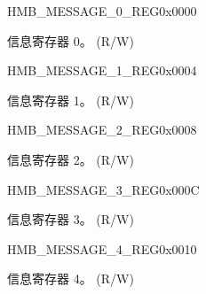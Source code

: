 \begin{register}{H}{MB\_MESSAGE\_0\_REG}{0x0000}\label{regdesc:MBMESSAGE0REG}
%
\regnewline%
\begin{regdesc}\begin{reglist}
\label{fielddesc:MBMESSAGE0}\item [MB\_MESSAGE\_0] 信息寄存器 0。 (R/W)
\end{reglist}\end{regdesc}
\end{register}


\begin{register}{H}{MB\_MESSAGE\_1\_REG}{0x0004}\label{regdesc:MBMESSAGE1REG}
%
\regnewline%
\begin{regdesc}\begin{reglist}
\label{fielddesc:MBMESSAGE1}\item [MB\_MESSAGE\_1] 信息寄存器 1。 (R/W)
\end{reglist}\end{regdesc}
\end{register}


\begin{register}{H}{MB\_MESSAGE\_2\_REG}{0x0008}\label{regdesc:MBMESSAGE2REG}
%
\regnewline%
\begin{regdesc}\begin{reglist}
\label{fielddesc:MBMESSAGE2}\item [MB\_MESSAGE\_2] 信息寄存器 2。 (R/W)
\end{reglist}\end{regdesc}
\end{register}


\begin{register}{H}{MB\_MESSAGE\_3\_REG}{0x000C}\label{regdesc:MBMESSAGE3REG}
%
\regnewline%
\begin{regdesc}\begin{reglist}
\label{fielddesc:MBMESSAGE3}\item [MB\_MESSAGE\_3] 信息寄存器 3。 (R/W)
\end{reglist}\end{regdesc}
\end{register}


\begin{register}{H}{MB\_MESSAGE\_4\_REG}{0x0010}\label{regdesc:MBMESSAGE4REG}
%
\regnewline%
\begin{regdesc}\begin{reglist}
\label{fielddesc:MBMESSAGE4}\item [MB\_MESSAGE\_4] 信息寄存器 4。 (R/W)
\end{reglist}\end{regdesc}
\end{register}



